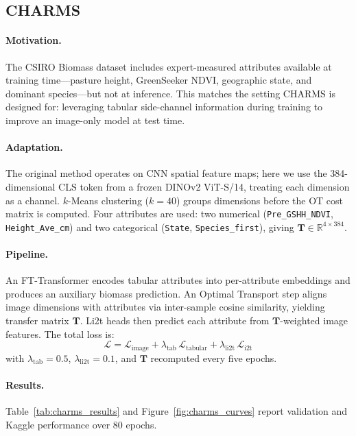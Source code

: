 \documentclass[10pt, a4paper]{article}
\begin{document}
\subsection{CHARMS}
\label{sec:charms}

\paragraph{Motivation.}
The CSIRO Biomass dataset includes expert-measured attributes available at
training time---pasture height, GreenSeeker NDVI, geographic state, and
dominant species---but not at inference. This matches the setting CHARMS
\citep{jiang2024} is designed for: leveraging tabular side-channel information
during training to improve an image-only model at test time.

\paragraph{Adaptation.}
The original method operates on CNN spatial feature maps; here we use the
384-dimensional CLS token from a frozen DINOv2 ViT-S/14, treating each
dimension as a channel. $k$-Means clustering ($k = 40$) groups dimensions
before the OT cost matrix is computed. Four attributes are used: two numerical
(\texttt{Pre\_GSHH\_NDVI}, \texttt{Height\_Ave\_cm}) and two categorical
(\texttt{State}, \texttt{Species\_first}), giving
$\mathbf{T} \in \mathbb{R}^{4 \times 384}$.

\paragraph{Pipeline.}
An FT-Transformer \citep{gorishniy2021} encodes tabular attributes into
per-attribute embeddings and produces an auxiliary biomass prediction. An
Optimal Transport step aligns image dimensions with attributes via inter-sample
cosine similarity, yielding transfer matrix $\mathbf{T}$. Li2t heads then
predict each attribute from $\mathbf{T}$-weighted image features. The total
loss is:
\begin{equation}
    \mathcal{L}
    =
    \mathcal{L}_{\text{image}}
    +
    \lambda_{\text{tab}}\,\mathcal{L}_{\text{tabular}}
    +
    \lambda_{\text{li2t}}\,\mathcal{L}_{\text{i2t}}
\end{equation}
with $\lambda_{\text{tab}} = 0.5$, $\lambda_{\text{li2t}} = 0.1$, and
$\mathbf{T}$ recomputed every five epochs.

\paragraph{Results.}
Table~\ref{tab:charms_results} and Figure~\ref{fig:charms_curves} report
validation and Kaggle performance over 80 epochs.
\end{document}
